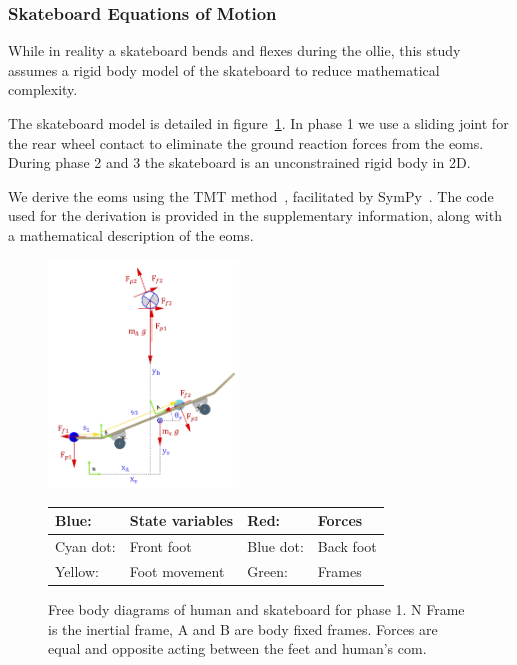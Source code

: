 \documentclass[default,iicol]{sn-jnl}
\begin{document}
\subsubsection{Skateboard Equations of Motion}
While in reality a skateboard bends and flexes during the ollie, this study assumes a rigid body model of the skateboard to reduce mathematical complexity.

The skateboard model is detailed in figure~\ref{fig:FBD}. In phase 1 we use a sliding joint for the rear wheel contact to eliminate the ground reaction forces from the \glspl{eom}.
During phase 2 and 3 the skateboard is an unconstrained rigid body in 2D. 

We derive the \glspl{eom} using the TMT method~\cite{vallery_heike_advanced_2018}, facilitated by SymPy~\cite{meurer_sympy_2017}.
The code used for the derivation is provided in the supplementary information, along with a mathematical description of the \glspl{eom}.

\begin{figure}
    \centering
    \includegraphics[width=0.45\textwidth]{figure/FBD_skater_feet.png}
    \footnotesize\begin{tabular}{|l l|l l|} \hline
    \color{blue}Blue: & State variables &\color{red} Red: & Forces \\ \hline
    \color{cyan}Cyan dot: & Front foot & \color{blue}Blue dot: & Back foot \\ \hline
    \color{yellow}Yellow: & Foot movement & \color{green}Green: & Frames \\ \hline
    \end{tabular}
    \caption[Free Body Diagrams phase 2 and 3]{Free body diagrams of human and skateboard for phase 1. N Frame is the inertial frame, A and B are body fixed frames. Forces are equal and opposite acting between the feet and human's \gls{com}.}
    \label{fig:FBD}
\end{figure}
\end{document}
